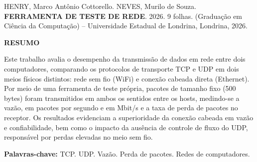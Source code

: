 \noindent HENRY, Marco Antônio Cottorello. NEVES, Murilo de Souza.
\textbf{FERRAMENTA DE TESTE DE REDE}. 2026.
9 folhas.
(Graduação em Ciência da Computação) -- Universidade Estadual de Londrina,
Londrina, 2026.

\vspace{2\baselineskip}

\begin{center}
  \textbf{RESUMO}
\end{center}

\vspace{\baselineskip}

\noindent Este trabalho avalia o desempenho da transmissão de dados em rede entre dois computadores, comparando os protocolos de transporte TCP e UDP em dois meios
físicos distintos: rede sem fio (WiFi) e conexão cabeada direta (Ethernet).
Por meio de uma ferramenta de teste própria, pacotes de tamanho fixo (500
bytes) foram transmitidos em ambos os sentidos entre os hosts, medindo-se a
vazão, em pacotes por segundo e em Mbit/s e a taxa de perda de pacotes
no receptor. Os resultados evidenciam a superioridade da conexão cabeada em
vazão e confiabilidade, bem como o impacto da ausência de controle de fluxo do
UDP, responsável por perdas elevadas no meio sem fio.

\vfill

\noindent\textbf{Palavras-chave:} TCP. UDP. Vazão. Perda de pacotes. Redes de computadores.

